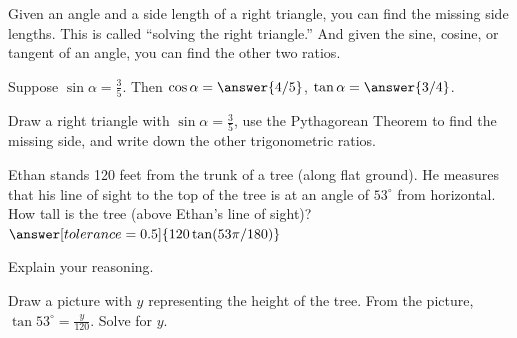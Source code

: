 \documentclass[nooutcomes]{ximera}
\begin{document}
Given an angle and a side length of a right triangle, you can find the missing side lengths.  This is called ``solving the right triangle.''    
And given the sine, cosine, or tangent of an angle, you can find the other two ratios. 

\begin{problem}
Suppose $\sin\alpha = \frac{3}{5}$.  Then $\cos\alpha = \answer{4/5}$, $\tan\alpha = \answer{3/4}$.  
\begin{hint}Draw a right triangle with $\sin\alpha = \frac{3}{5}$, use the Pythagorean Theorem to find the missing side, 
and write down the other trigonometric ratios.\end{hint}
\end{problem}

\begin{problem}
Ethan stands 120 feet from the trunk of a tree (along flat ground). He measures that his line of sight to the top of the tree is at an angle of $53^\circ$ from horizontal. How tall is the tree (above Ethan's line of sight)?  $\answer[tolerance=0.5]{120\tan(53\pi/180)}$

Explain your reasoning.
\begin{hint}Draw a picture with $y$ representing the height of the tree.  From the picture, $\tan 53^\circ = \frac{y}{120}$.  Solve for $y$. \end{hint}
\end{problem}

%
%
\end{document}

